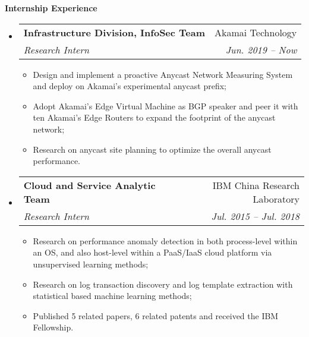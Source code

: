 \documentclass[letterpaper,11pt]{article}
\makeatletter
\newcommand{\resitem}[1]{\item #1 \vspace{-2pt}}
\newcommand{\resheading}[1]{{\large \colorbox{mygrey}{\begin{minipage}{\textwidth}{\textbf{#1 \vphantom{p\^{E}}}}\end{minipage}}}}
\newcommand{\ressubheading}[4]{
\begin{tabular*}{6.5in}{l@{\extracolsep{\fill}}r}
		\textbf{#1} & #2 \\
		\textit{#3} & \textit{#4} \\
\end{tabular*}\vspace{-6pt}}
\makeatother
\begin{document}
\resheading{Internship Experience}
	\begin{itemize}
	    \item 
			\ressubheading{Infrastructure Division, InfoSec Team}{Akamai Technology}{Research Intern}{Jun. 2019 -- Now}
				{ \footnotesize
				\begin{itemize}
				    \resitem{Design and implement a proactive Anycast Network Measuring System and deploy on Akamai's experimental anycast prefix;}
				    \resitem{Adopt Akamai's Edge Virtual Machine as BGP speaker and peer it with ten Akamai's Edge Routers to expand the footprint of the anycast network;}
					\resitem{Research on anycast site planning to optimize the overall anycast performance.}
				\end{itemize}
				}
		\item 
			\ressubheading{Cloud and Service Analytic Team}{IBM China Research Laboratory}{Research Intern}{Jul. 2015 -- Jul. 2018}
				{ \footnotesize
				\begin{itemize}
					\resitem{Research on performance anomaly detection in both process-level within an OS, and also host-level within a PaaS/IaaS cloud platform via unsupervised learning methods;}
					\resitem{Research on log transaction discovery and log template extraction with statistical based machine learning methods;}
					\resitem{Published 5 related papers, 6 related patents and received the IBM Fellowship.}
				\end{itemize}
				}

	\end{itemize}
	
\end{document}
